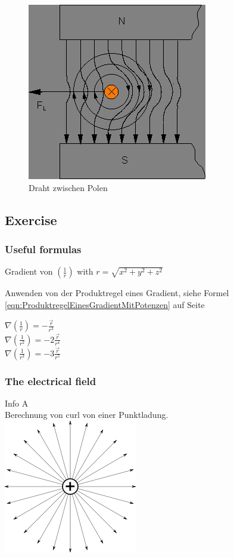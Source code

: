 \documentclass[a4paper]{scrartcl}
\begin{document}
\begin{figure}[h!]
\begin{center}
\includegraphics[scale=0.5]{images/DrahtZwischenPolen.png}
\caption{Draht zwischen Polen}
\label{fig:DrahtZwischenPolen}
\end{center}
\end{figure}


\subsection{Exercise}
\subsubsection{Useful formulas}

Gradient von $ (\frac{1}{r}) $  with $ r=\sqrt{x^2+y^2+z^2} $

Anwenden von der Produktregel eines Gradient, siehe Formel \ref{eqn:ProduktregelEinesGradientMitPotenzen} auf Seite \pageref{eqn:ProduktregelEinesGradientMitPotenzen}

$ \nabla(\frac{1}{r}) = -\frac{\vec{r}}{r^3}$
\\
$ \nabla(\frac{1}{r^2}) = -2\frac{\vec{r}}{r^4}$
\\
$ \nabla(\frac{1}{r^3}) = -3\frac{\vec{r}}{r^5}$

\subsubsection{The electrical field}

Info A\\
Berechnung von curl von einer Punktladung.\\ \includegraphics[scale=0.2]{images/punktladung.png}
\label{fig:Punktladung}
\end{document}
